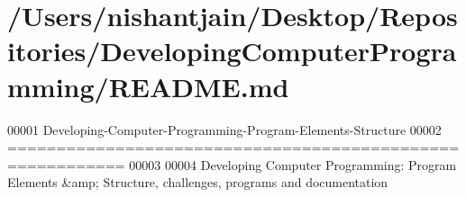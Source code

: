 \hypertarget{_r_e_a_d_m_e_8md_source}{\section{/\+Users/nishantjain/\+Desktop/\+Repositories/\+Developing\+Computer\+Programming/\+R\+E\+A\+D\+M\+E.md}
}

\begin{DoxyCode}
00001 Developing-Computer-Programming-Program-Elements-Structure
00002 ==========================================================
00003 
00004 Developing Computer Programming: Program Elements &amp; Structure, challenges, programs and
       documentation
\end{DoxyCode}
